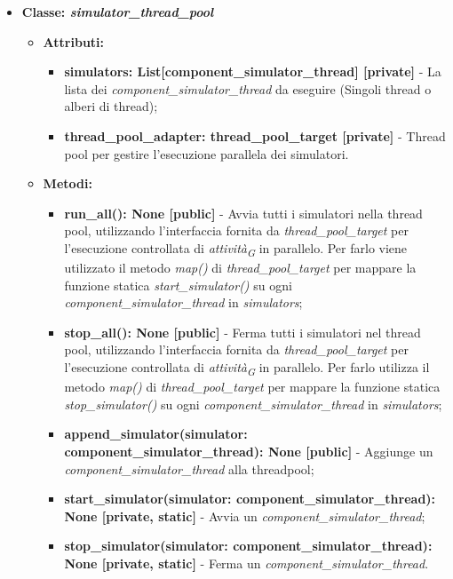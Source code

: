 \begin{itemize}
    \item{\textbf{Classe: \textit{simulator\_thread\_pool}}}
    \begin{itemize}
        \item\textbf{Attributi:}
        \begin{itemize}
            \item \textbf{simulators: List[component\_simulator\_thread] [private]} - La lista dei \textit{component\_simulator\_thread} da eseguire (Singoli thread o alberi di thread);
            \item \textbf{thread\_pool\_adapter: thread\_pool\_target [private]} - Thread pool per gestire l'esecuzione parallela dei simulatori.
        \end{itemize}
        \item \textbf{Metodi:}
        \begin{itemize}
            \item \textbf{run\_all(): None [public]} - Avvia tutti i simulatori nella thread pool, utilizzando l'interfaccia fornita da \textit{thread\_pool\_target} per l'esecuzione controllata di \textit{attività}\textsubscript{\textit{G}} in parallelo.
            Per farlo viene utilizzato il metodo \textit{map()} di \textit{thread\_pool\_target} per mappare la funzione statica \textit{start\_simulator()} su ogni \textit{component\_simulator\_thread} in \textit{simulators};
            \item \textbf{stop\_all(): None [public]} - Ferma tutti i simulatori nel thread pool, utilizzando l'interfaccia fornita da \textit{thread\_pool\_target} per l'esecuzione controllata di \textit{attività}\textsubscript{\textit{G}} in parallelo.
            Per farlo utilizza il metodo \textit{map()} di \textit{thread\_pool\_target} per mappare la funzione statica \textit{stop\_simulator()} su ogni \textit{component\_simulator\_thread} in \textit{simulators};
            \item \textbf{append\_simulator(simulator: component\_simulator\_thread): None [public]} - Aggiunge un \textit{component\_simulator\_thread} alla threadpool;
            \item \textbf{start\_simulator(simulator: component\_simulator\_thread): None [private, static]} - Avvia un \textit{component\_simulator\_thread};
            \item \textbf{stop\_simulator(simulator: component\_simulator\_thread): None [private, static]} - Ferma un \textit{component\_simulator\_thread}.
        \end{itemize}

\end{itemize}
\end{itemize}

